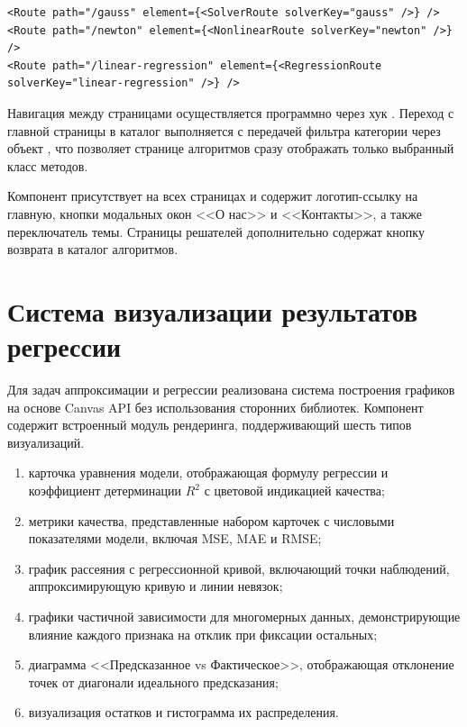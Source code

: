\documentclass[12pt, oneside]{book}
\begin{document}
\begin{verbatim}
<Route path="/gauss" element={<SolverRoute solverKey="gauss" />} />
<Route path="/newton" element={<NonlinearRoute solverKey="newton" />} />
<Route path="/linear-regression" element={<RegressionRoute solverKey="linear-regression" />} />
\end{verbatim}

    \quad Навигация между страницами осуществляется программно через хук \texttt{}. Переход с главной страницы в каталог выполняется с передачей фильтра категории через объект \texttt{}, что позволяет странице алгоритмов сразу отображать только выбранный класс методов.

    \quad Компонент \texttt{} присутствует на всех страницах и содержит логотип-ссылку на главную, кнопки модальных окон <<О нас>> и <<Контакты>>, а также переключатель темы. Страницы решателей дополнительно содержат кнопку возврата в каталог алгоритмов.

\section{Система визуализации результатов регрессии}

    \quad Для задач аппроксимации и регрессии реализована система построения графиков на основе Canvas API без использования сторонних библиотек. Компонент \texttt{} содержит встроенный модуль рендеринга, поддерживающий шесть типов визуализаций.

\begin{enumerate}
    \item карточка уравнения модели, отображающая формулу регрессии и коэффициент детерминации $R^2$ с цветовой индикацией качества;
    \item метрики качества, представленные набором карточек с числовыми показателями модели, включая MSE, MAE и RMSE;
    \item график рассеяния с регрессионной кривой, включающий точки наблюдений, аппроксимирующую кривую и линии невязок;
    \item графики частичной зависимости для многомерных данных, демонстрирующие влияние каждого признака на отклик при фиксации остальных;
    \item диаграмма <<Предсказанное vs Фактическое>>, отображающая отклонение точек от диагонали идеального предсказания;
    \item визуализация остатков и гистограмма их распределения.
\end{enumerate}
\end{document}
